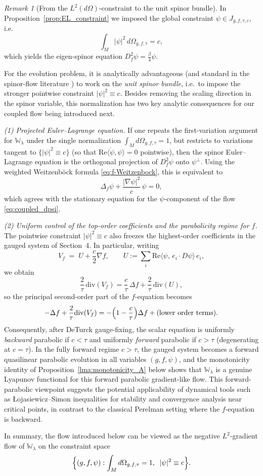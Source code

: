 \documentclass{amsart}
\theoremstyle{definition}
\theoremstyle{remark}
\newtheorem{remark}[theorem]{Remark}
\numberwithin{equation}{section}
\begin{document}
\begin{remark}[From the $L^2(d\Omega)$-constraint to the unit spinor bundle]
In Proposition~\ref{prop:EL_constraint} we imposed the global constraint $\psi\in J_{g,f,\tau,c}$, i.e.
\[
\int_M |\psi|^2\,d\Omega_{g,f,\tau}=c,
\]
which yields the eigen-spinor equation $D_f^2\psi=\frac{\beta}{4}\psi$.

For the evolution problem, it is analytically advantageous (and standard in the spinor-flow literature
\cite{AWW}) to work on the \emph{unit spinor bundle}, i.e.\ to impose the stronger pointwise constraint
$|\psi|^2\equiv c$. Besides removing the scaling direction in the spinor variable, this normalization
has two key analytic consequences for our coupled flow being introduced next.

\smallskip
\noindent\emph{(1) Projected Euler--Lagrange equation.}
If one repeats the first-variation argument for $\mathbb{W}_\lambda$ under the single normalization
$\int_M d\Omega_{g,f,\tau}=1$, but restricts to variations tangent to $\{|\psi|^2\equiv c\}$
(so that $\mathrm{Re}\langle\dot\psi,\psi\rangle=0$ pointwise), then the spinor Euler--Lagrange equation
is the orthogonal projection of $D_f^2\psi$ onto $\psi^\perp$. Using the weighted Weitzenb\"ock formula
\eqref{eq:f-Weitzenbock}, this is equivalent to
\[
\Delta_f\psi+\frac{|\nabla\psi|^2}{c}\,\psi=0,
\]
which agrees with the stationary equation for the $\psi$-component of the flow \eqref{eq:coupled_dpsi}.

\smallskip
\noindent\emph{(2) Uniform control of the top-order coefficients and the parabolicity regime for $f$.}
The pointwise constraint $|\psi|^2\equiv c$ also freezes the highest-order coefficients in the gauged
system of Section~4. In particular, writing
\[
V_f \;=\; U + \frac{c}{2}\nabla f,
\qquad
U := \sum_i \mathrm{Re}\langle\psi,\,e_i\!\cdot D\psi\rangle\,e_i,
\]
we obtain
\[
\frac{2}{\tau}\,\mathrm{div}(V_f)
= \frac{c}{\tau}\,\Delta f + \frac{2}{\tau}\,\mathrm{div}(U),
\]
so the principal second-order part of the $f$-equation becomes
\[
-\Delta f + \frac{2}{\tau}\mathrm{div}(V_f)
= -\Bigl(1-\frac{c}{\tau}\Bigr)\Delta f + \text{(lower order terms)}.
\]
Consequently, after DeTurck gauge-fixing, the scalar equation is uniformly \emph{backward} parabolic
if $c<\tau$ and uniformly \emph{forward} parabolic if $c>\tau$ (degenerating at $c=\tau$). In the
fully forward regime $c>\tau$, the gauged system becomes a forward quasilinear parabolic evolution
in all variables $(g,f,\psi)$, and the monotonicity identity of Proposition~\ref{lma:monotonicity_A} below shows that
$\mathbb{W}_\lambda$ is a genuine Lyapunov functional for this forward parabolic gradient-like flow. This
forward-parabolic viewpoint suggests the potential applicability of dynamical tools such as
{\L}ojasiewicz--Simon inequalities for stability and convergence analysis near critical points,
in contrast to the classical Perelman setting where the $f$-equation is backward.

\smallskip
In summary, the flow introduced below can be viewed as the negative $L^2$-gradient flow of $\mathbb{W}_\lambda$
on the constraint space
\[
\Bigl\{(g,f,\psi): \int_M d\Omega_{g,f,\tau}=1,\;\;|\psi|^2\equiv c\Bigr\}.
\]
\end{remark}
\end{document}
